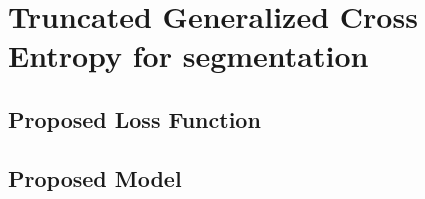 
\chapter{Truncated Generalized Cross Entropy for
segmentation}\label{ch:seg_tgce}

\section{Proposed Loss Function}

\section{Proposed Model}
